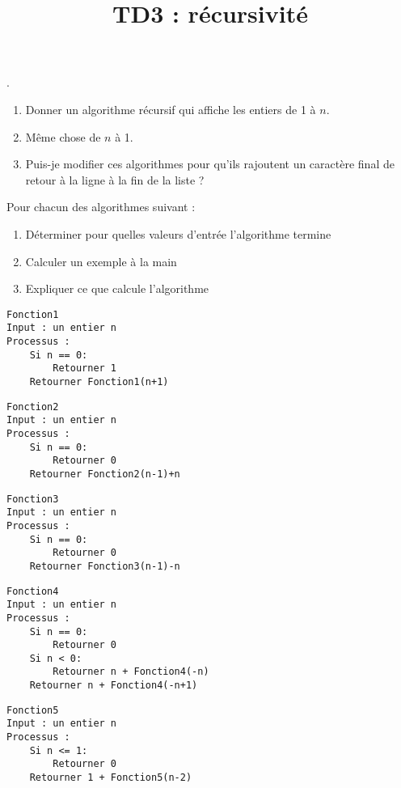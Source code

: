 \documentclass{../cours}
\title{TD3 : récursivité}
\begin{document}
\maketitle

\begin{exercice}.
\vspace{-0.5cm}
\begin{enumerate}
\item Donner un algorithme récursif qui affiche les entiers de 1 à $n$.
\item Même chose de $n$ à 1.
\item Puis-je modifier ces algorithmes pour qu'ils rajoutent un caractère final de retour à la ligne à la fin de la liste ?
\end{enumerate}
\end{exercice}

\begin{exercice}
Pour chacun des algorithmes suivant :
\begin{enumerate}
\item Déterminer pour quelles valeurs d'entrée l'algorithme termine
\item Calculer un exemple à la main
\item Expliquer ce que calcule l'algorithme
\end{enumerate}

\begin{lstlisting}
Fonction1
Input : un entier n
Processus :
    Si n == 0:
        Retourner 1
    Retourner Fonction1(n+1)
\end{lstlisting}

\begin{lstlisting}
Fonction2
Input : un entier n
Processus :
    Si n == 0:
        Retourner 0
    Retourner Fonction2(n-1)+n
\end{lstlisting}

\begin{lstlisting}
Fonction3
Input : un entier n
Processus :
    Si n == 0:
        Retourner 0
    Retourner Fonction3(n-1)-n
\end{lstlisting}

\begin{lstlisting}
Fonction4
Input : un entier n
Processus :
    Si n == 0:
        Retourner 0
    Si n < 0:
        Retourner n + Fonction4(-n)
    Retourner n + Fonction4(-n+1)
\end{lstlisting}

\begin{lstlisting}
Fonction5
Input : un entier n
Processus :
    Si n <= 1:
        Retourner 0
    Retourner 1 + Fonction5(n-2)
\end{lstlisting}

\end{exercice}
\end{document}
